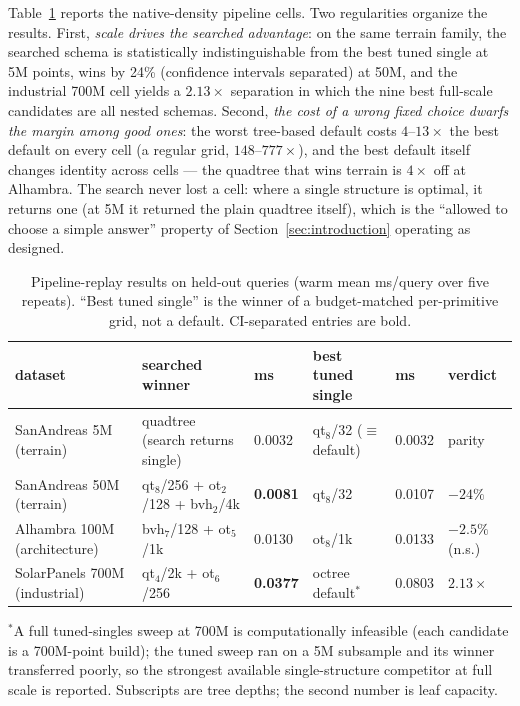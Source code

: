 Table~\ref{tab:pipeline} reports the native-density pipeline cells. Two regularities organize the results. First, \emph{scale drives the searched advantage}: on the same terrain family, the searched schema is statistically indistinguishable from the best tuned single at 5M points, wins by 24\% (confidence intervals separated) at 50M, and the industrial 700M cell yields a $2.13\times$ separation in which the nine best full-scale candidates are all nested schemas. Second, \emph{the cost of a wrong fixed choice dwarfs the margin among good ones}: the worst tree-based default costs $4$--$13\times$ the best default on every cell (a regular grid, $148$--$777\times$), and the best default itself changes identity across cells --- the quadtree that wins terrain is $4\times$ off at Alhambra. The search never lost a cell: where a single structure is optimal, it returns one (at 5M it returned the plain quadtree itself), which is the ``allowed to choose a simple answer'' property of Section~\ref{sec:introduction} operating as designed.

\begin{table}[t]
  \centering
  \caption{Pipeline-replay results on held-out queries (warm mean ms/query over five repeats). ``Best tuned single'' is the winner of a budget-matched per-primitive grid, not a default. CI-separated entries are bold.}
  \label{tab:pipeline}
  \small
  \begin{tabular}{llllll}
    \toprule
    dataset & searched winner & ms & best tuned single & ms & verdict \\
    \midrule
    SanAndreas 5M (terrain)       & quadtree (search returns single) & 0.0032 & qt$_{8}$/32 ($\equiv$ default) & 0.0032 & parity \\
    SanAndreas 50M (terrain)      & qt$_{8}$/256 + ot$_{2}$/128 + bvh$_{2}$/4k & \textbf{0.0081} & qt$_{8}$/32 & 0.0107 & \textbf{$-24\%$} \\
    Alhambra 100M (architecture)  & bvh$_{7}$/128 + ot$_{5}$/1k & 0.0130 & ot$_{8}$/1k & 0.0133 & $-2.5\%$ (n.s.) \\
    SolarPanels 700M (industrial) & qt$_{4}$/2k + ot$_{6}$/256 & \textbf{0.0377} & octree default$^{\ast}$ & 0.0803 & \textbf{$2.13\times$} \\
    \bottomrule
  \end{tabular}

  \smallskip
  \raggedright\footnotesize $^{\ast}$A full tuned-singles sweep at 700M is computationally infeasible (each candidate is a 700M-point build); the tuned sweep ran on a 5M subsample and its winner transferred poorly, so the strongest available single-structure competitor at full scale is reported. Subscripts are tree depths; the second number is leaf capacity.
\end{table}

